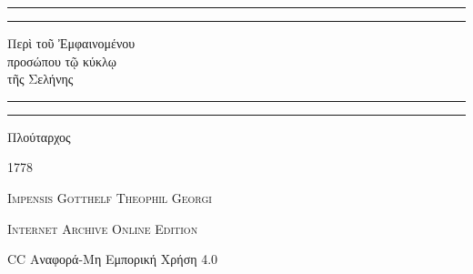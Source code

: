 \documentclass[a4paper, 11pt, oneside, polutonikogreek, german]{article}
\begin{document}
\begin{titlepage} %
	\centering %


	\rule{\textwidth}{1.6pt}\vspace*{-\baselineskip}\vspace*{2pt} %
	\rule{\textwidth}{0.4pt} %
	
	\vspace{0.5\baselineskip} %
	
	{\Huge Περὶ τοῦ Ἐμφαινομένου \\ προσώπου τῷ κύκλῳ \\ τῆς Σελήνης}
	
	\vspace{0.5\baselineskip} %

	\rule{\textwidth}{0.4pt}\vspace*{-\baselineskip}\vspace{3.2pt} %
	\rule{\textwidth}{1.6pt} %
	
	\vspace{1\baselineskip} %
	
	
	{\Large Πλούταρχος}
 
        \vspace{0.25\baselineskip}
	
	\vspace*{0.5\baselineskip} %
	
        {\scshape \normalsize } %

        \vspace*{\fill}    

	\vspace{0.5\baselineskip}

	{\small\scshape 1778}
	
	{\small\scshape{Impensis Gotthelf Theophil Georgi}}
	
	\vspace{0.25\baselineskip} %

        {\scshape Internet Archive Online Edition}%
    
	{\small CC Αναφορά-Μη Εμπορική Χρήση 4.0} %
\end{titlepage}
\setlength{\parskip}{1mm plus1mm minus1mm}
\clearpage
\large
\end{document}
